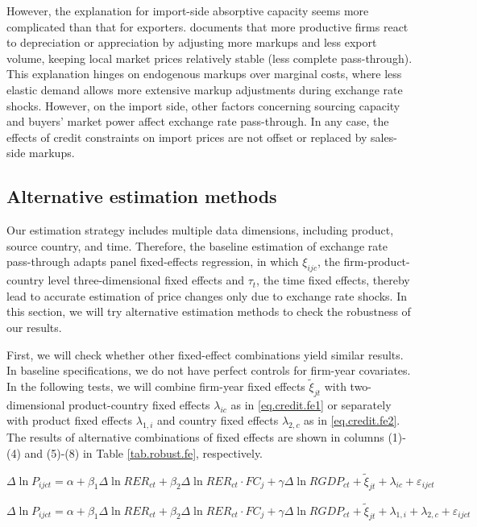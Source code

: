 \documentclass[12pt]{article}
\begin{document}
However, the explanation for import-side absorptive capacity seems more complicated than that for exporters. \cite{bmm2012} documents that more productive firms react to depreciation or appreciation by adjusting more markups and less export volume, keeping local market prices relatively stable (less complete pass-through). This explanation hinges on endogenous markups over marginal costs, where less elastic demand allows more extensive markup adjustments during exchange rate shocks. However, on the import side, other factors concerning sourcing capacity and buyers' market power affect exchange rate pass-through. In any case, the effects of credit constraints on import prices are not offset or replaced by sales-side markups.

\subsection{Alternative estimation methods}

Our estimation strategy includes multiple data dimensions, including product, source country, and time. Therefore, the baseline estimation of exchange rate pass-through adapts panel fixed-effects regression, in which $\xi_{ijc}$, the firm-product-country level three-dimensional fixed effects and $\tau_t$, the time fixed effects, thereby lead to accurate estimation of price changes only due to exchange rate shocks. In this section, we will try alternative estimation methods to check the robustness of our results.

First, we will check whether other fixed-effect combinations yield similar results. In baseline specifications, we do not have perfect controls for firm-year covariates. In the following tests, we will combine firm-year fixed effects $\tilde{\xi}_{jt}$ with two-dimensional product-country fixed effects $\lambda_{ic}$ as in \ref{eq.credit.fe1} or separately with product fixed effects $\lambda_{1, i}$ and country fixed effects $\lambda_{2, c}$ as in \ref{eq.credit.fe2}. The results of alternative combinations of fixed effects are shown in columns (1)-(4) and (5)-(8) in Table \ref{tab.robust.fe}, respectively. 

\begin{equation}
    \Delta \ln P_{ijct}=\alpha+\beta_{1} \Delta \ln RER_{ct}+\beta_{2} \Delta \ln RER_{ct} \cdot FC_{j}+\gamma \Delta \ln RGDP_{ct}+\tilde{\xi}_{jt}+\lambda_{ic}+\varepsilon_{ijct}
	\label{eq.credit.fe1}
\end{equation}

\begin{equation}
    \Delta \ln P_{ijct}=\alpha+\beta_{1} \Delta \ln RER_{ct}+\beta_{2} \Delta \ln RER_{ct} \cdot FC_{j}+\gamma \Delta \ln RGDP_{ct}+\tilde{\xi}_{jt}+\lambda_{1, i} + \lambda_{2, c} +\varepsilon_{ijct}
	\label{eq.credit.fe2}
\end{equation}
\end{document}

